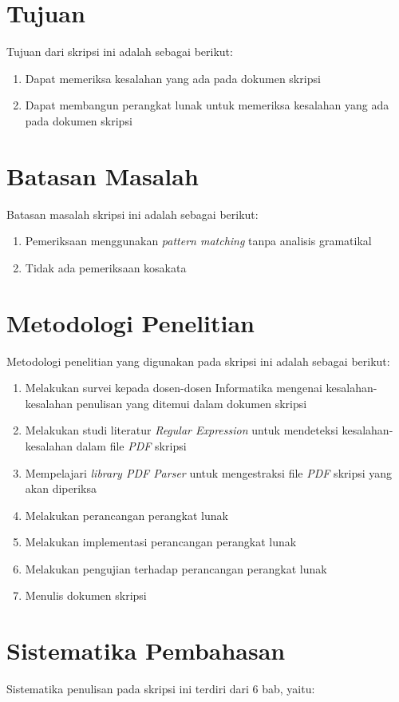 \section{Tujuan}
\label{sec:tujuan}
Tujuan dari skripsi ini adalah sebagai berikut:
\begin{enumerate}
	\item Dapat memeriksa kesalahan yang ada pada dokumen skripsi
	\item Dapat membangun perangkat lunak untuk memeriksa kesalahan yang ada pada dokumen skripsi
\end{enumerate}

\section{Batasan Masalah}
\label{sec:batasan}
Batasan masalah skripsi ini adalah sebagai berikut:
\begin{enumerate}
	\item Pemeriksaan menggunakan \textit{pattern matching} tanpa analisis gramatikal
	\item Tidak ada pemeriksaan kosakata
\end{enumerate}

\section{Metodologi Penelitian}
\label{sec:metlit}
Metodologi penelitian yang digunakan pada skripsi ini adalah sebagai berikut:
\begin{enumerate}
	\item Melakukan survei kepada dosen-dosen Informatika mengenai kesalahan-kesalahan penulisan yang ditemui dalam dokumen skripsi	
	\item Melakukan studi literatur \textit{Regular Expression} untuk mendeteksi kesalahan-kesalahan dalam file \textit{PDF} skripsi
	\item Mempelajari \textit{library PDF Parser} untuk mengestraksi file \textit{PDF} skripsi yang akan diperiksa
	\item Melakukan perancangan perangkat lunak
	\item Melakukan implementasi perancangan perangkat lunak
	\item Melakukan pengujian terhadap perancangan perangkat lunak
	\item Menulis dokumen skripsi
\end{enumerate}

\section{Sistematika Pembahasan}
\label{sec:sispem}
Sistematika penulisan pada skripsi ini terdiri dari 6 bab, yaitu:

